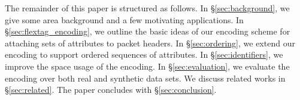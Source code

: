

The remainder of this paper is structured as follows. In \S \ref{sec:background}, we give some area background and a few motivating applications. In \S \ref{sec:flextag_encoding}, we outline the basic ideas of our encoding scheme for attaching sets of attributes to packet headers. In \S \ref{sec:ordering}, we extend our encoding to support ordered sequences of attributes. In \S \ref{sec:identifiers}, we improve the space usage of the encoding. In \S \ref{sec:evaluation}, we evaluate the encoding over both real and synthetic data sets. We discuss related works in \S \ref{sec:related}. The paper concludes with \S \ref{sec:conclusion}.






%

